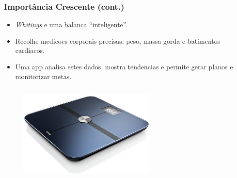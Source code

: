\documentclass[hyperref={pdfpagelabels=true}]{beamer}
\begin{document}
\begin{frame}
\frametitle{Import\^{a}ncia Crescente (cont.)}

      \begin{itemize}
        \item<1->\textit{Whitings} e uma balanca ``inteligente''.
        \item<2->Recolhe medicoes corporais precisas: peso, massa gorda e batimentos cardiacos.
        \item<3->Uma app analisa estes dados, mostra tendencias e permite gerar planos e monitorizar metas.%
      \end{itemize}                
      
\begin{columns}
  \begin{column}{0.7\textwidth}
    \begin{figure}  
	\includegraphics[width=0.7\textwidth]{scale.png}\\
       \end{figure}             
  \end{column}
  \begin{column}{0.3\textwidth}
      \begin{figure}  

\end{figure}
\end{column}
\end{columns}
\end{frame}
\end{document}
